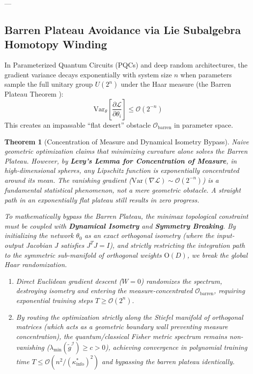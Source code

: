 \documentclass[11pt,reqno]{amsart}
\newtheorem{theorem}{Theorem}[section]
\theoremstyle{definition}
\newcommand{\Fisher}{\mathcal{I}}
\newcommand{\Loss}{\mathcal{L}}
\numberwithin{equation}{section}
\begin{document}
---

\subsection{Barren Plateau Avoidance via Lie Subalgebra Homotopy Winding}
In Parameterized Quantum Circuits (PQCs) and deep random architectures, the gradient variance decays exponentially with system size $n$ when parameters sample the full unitary group $U(2^n)$ under the Haar measure (the Barren Plateau Theorem \cite{mcclean2018}):
\begin{equation}
\mathrm{Var}_{\theta} \left[ \frac{\partial \Loss}{\partial \theta_i} \right] \le \mathcal{O}(2^{-n})
\end{equation}
This creates an impassable ``flat desert'' obstacle $\mathcal{O}_{\mathrm{barren}}$ in parameter space.

\begin{theorem}[Concentration of Measure and Dynamical Isometry Bypass]
\label{thm:barren_plateau_bypass}
Naive geometric optimization claims that minimizing curvature alone solves the Barren Plateau. However, by \textbf{Levy's Lemma for Concentration of Measure}, in high-dimensional spheres, any Lipschitz function is exponentially concentrated around its mean. The vanishing gradient ($\mathrm{Var}(\nabla \Loss) \sim \mathcal{O}(2^{-n})$) is a fundamental statistical phenomenon, not a mere geometric obstacle. A straight path in an exponentially flat plateau still results in zero progress.

To mathematically bypass the Barren Plateau, the minimax topological constraint must be coupled with \textbf{Dynamical Isometry} and \textbf{Symmetry Breaking}. By initializing the network $\theta_0$ as an exact orthogonal isometry (where the input-output Jacobian $J$ satisfies $J^T J = I$), and strictly restricting the integration path to the symmetric sub-manifold of orthogonal weights $\mathrm{O}(D)$, we break the global Haar randomization. 
\begin{enumerate}
    \item Direct Euclidean gradient descent ($W = 0$) randomizes the spectrum, destroying isometry and entering the measure-concentrated $\mathcal{O}_{\mathrm{barren}}$, requiring exponential training steps $T \ge \mathcal{O}(2^n)$.
    \item By routing the optimization strictly along the Stiefel manifold of orthogonal matrices (which acts as a geometric boundary wall preventing measure concentration), the quantum/classical Fisher metric spectrum remains non-vanishing ($\lambda_{\min}(\tilde{g}^{\Fisher}) \ge c > 0$), achieving convergence in polynomial training time $T \le \mathcal{O}(n^2 / (\kappa^*_{\mathrm{info}})^2)$ and bypassing the barren plateau identically.
\end{enumerate}
\end{theorem}
\end{document}
